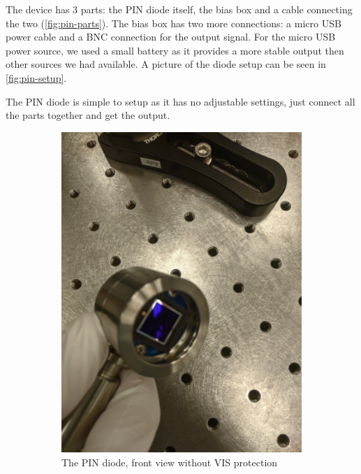 \documentclass[a4paper, 10pt]{article}
\begin{document}
The device has 3 parts: the PIN diode itself, the bias box and a cable connecting the two (\cref{fig:pin-parts}).
The bias box has two more connections: a micro USB power cable and a BNC connection for the output signal.
For the micro USB power source, we used a small battery as it provides a more stable output then other sources we had available.
A picture of the diode setup can be seen in \cref{fig:pin-setup}.

The PIN diode is simple to setup as it has no adjustable settings, just connect all the parts together and get the output.

\begin{figure}[h]
    \centering
    \begin{subfigure}{0.4\textwidth}
        \includegraphics[width=\textwidth]{../images/pin-front.jpg}
        \caption{The PIN diode, front view without VIS protection}
        \label{fig:pin-diode}
    \end{subfigure}
    \begin{subfigure}{0.4\textwidth}

\end{subfigure}
\end{figure}
\end{document}
